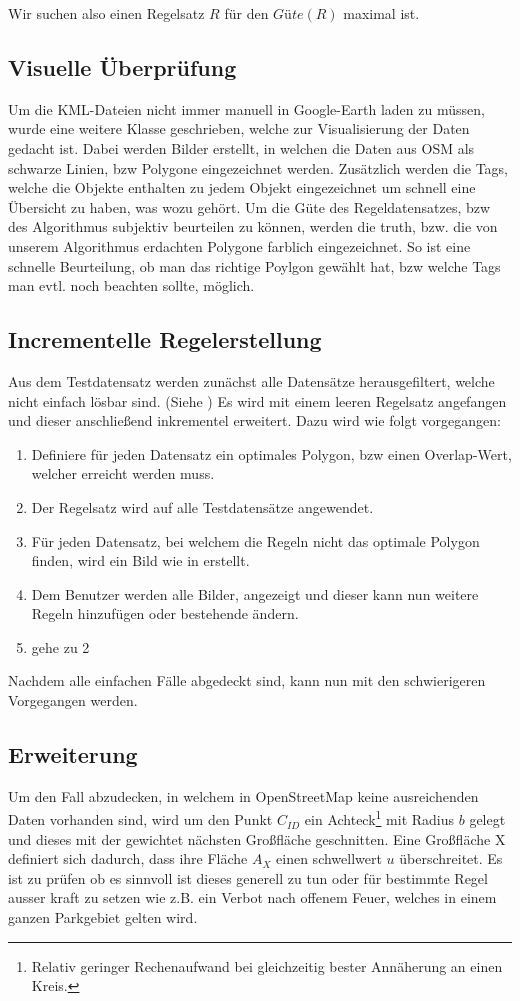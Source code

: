Wir suchen also einen Regelsatz $R$ für den $Güte(R)$ maximal ist.


\subsection{Visuelle Überprüfung}
\label{sec:visuelle_ueberpruefung}
Um die KML-Dateien nicht immer manuell in Google-Earth laden zu müssen, wurde eine weitere Klasse geschrieben, welche zur Visualisierung der Daten gedacht ist.
Dabei werden Bilder erstellt, in welchen die Daten aus OSM als schwarze Linien, bzw Polygone eingezeichnet werden. Zusätzlich werden die Tags,
welche die Objekte enthalten zu jedem Objekt eingezeichnet um schnell eine Übersicht zu haben, was wozu gehört.
Um die Güte des Regeldatensatzes, bzw des Algorithmus subjektiv beurteilen zu können, werden die truth, bzw. die von unserem Algorithmus erdachten Polygone
farblich eingezeichnet. So ist eine schnelle Beurteilung, ob man das richtige Poylgon gewählt hat, bzw welche Tags man evtl. noch beachten sollte, möglich.

\subsection{Incrementelle Regelerstellung}
Aus dem Testdatensatz werden zunächst alle Datensätze herausgefiltert, welche nicht einfach lösbar sind.
(Siehe )
Es wird mit einem leeren Regelsatz angefangen und dieser anschließend inkrementel erweitert. Dazu wird wie folgt vorgegangen:
\begin{enumerate}
\item Definiere für jeden Datensatz ein optimales Polygon, bzw einen Overlap-Wert, welcher erreicht werden muss.
\item Der Regelsatz wird auf alle Testdatensätze angewendet.
\item Für jeden Datensatz, bei welchem die Regeln nicht das optimale Polygon finden, wird ein Bild wie in  erstellt.
\item Dem Benutzer werden alle Bilder, angezeigt und dieser kann nun weitere Regeln hinzufügen oder bestehende ändern.
\item gehe zu 2
\end{enumerate}
Nachdem alle einfachen Fälle abgedeckt sind, kann nun mit den schwierigeren Vorgegangen werden.


\subsection{Erweiterung}
Um den Fall abzudecken, in welchem in OpenStreetMap keine ausreichenden Daten vorhanden sind, wird um den Punkt $C_{ID}$ ein
Achteck\footnote{Relativ geringer Rechenaufwand bei gleichzeitig bester Annäherung an einen Kreis.} mit Radius $b$ gelegt
und dieses mit der gewichtet nächsten Großfläche geschnitten.
Eine Großfläche X definiert sich dadurch, dass ihre Fläche $A_X$ einen schwellwert $u$ überschreitet.
Es ist zu prüfen ob es sinnvoll ist dieses generell zu tun oder für bestimmte Regel ausser kraft zu setzen wie
z.B. ein Verbot nach offenem Feuer, welches in einem ganzen Parkgebiet gelten wird.
